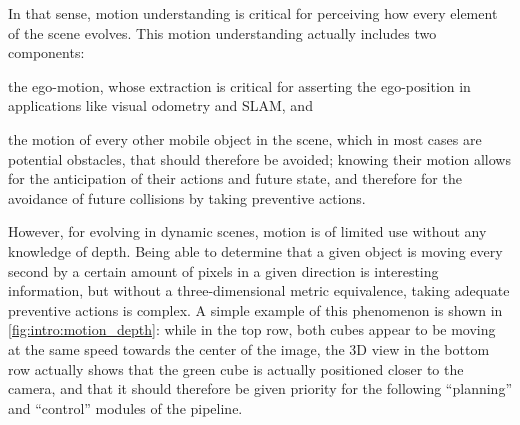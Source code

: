 In that sense, motion understanding is critical for perceiving how every element of the scene evolves. This motion understanding actually includes two components:
\begin{enumerate*}[label=\textbf{(\arabic*)}]
  \item the ego-motion, whose extraction is critical for asserting the ego-position in applications like visual odometry and SLAM, and
  \item the motion of every other mobile object in the scene, which in most cases are potential obstacles, that should therefore be avoided; knowing their motion allows for the anticipation of their actions and future state, and therefore for the avoidance of future collisions by taking preventive actions.
\end{enumerate*}

However, for evolving in dynamic scenes, motion is of limited use without any knowledge of depth. Being able to determine that a given object is moving every second by a certain amount of pixels in a given direction is interesting information, but without a three-dimensional metric equivalence, taking adequate preventive actions is complex. A simple example of this phenomenon is shown in \cref{fig:intro:motion_depth}: while in the top row, both cubes appear to be moving at the same speed towards the center of the image, the 3D view in the bottom row actually shows that the green cube is actually positioned closer to the camera, and that it should therefore be given priority for the following ``planning'' and ``control'' modules of the pipeline.

